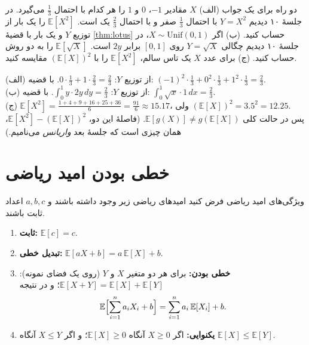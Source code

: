 \begin{example}[label=ex:lotus]{دو راه برای یک جواب}
  (الف) $X$ مقادیر $-1$، $0$ و $1$ را هر کدام با احتمال $\tfrac13$ می‌گیرد. در جلسهٔ ۱۰ دیدیم $Y=X^2$ با احتمال $\tfrac13$ صفر و با احتمال $\tfrac23$ یک است. $\mathbb E[X^2]$ را یک بار از توزیع $Y$ و یک بار با قضیهٔ \ref{thm:lotus} حساب کنید. (ب) اگر $X\sim\mathrm{Unif}(0,1)$، در جلسهٔ ۱۰ دیدیم چگالی $Y=\sqrt X$ روی $[0,1]$ برابر $2y$ است. $\mathbb E[\sqrt X]$ را به دو روش حساب کنید. (ج) برای عدد $X$ یک تاس سالم، $\mathbb E[X^2]$ را با $(\mathbb E[X])^2$ مقایسه کنید.
  \begin{solution}
    (الف) از توزیع $Y$: $0\cdot\tfrac13+1\cdot\tfrac23=\tfrac23$. با قضیه: $(-1)^2\cdot\tfrac13+0^2\cdot\tfrac13+1^2\cdot\tfrac13=\tfrac23$.\\
    (ب) از توزیع $Y$: $\int_0^1y\cdot2y\,dy=\tfrac23$. با قضیه: $\int_0^1\sqrt x\cdot1\,dx=\tfrac23$.\\
    (ج) $\mathbb E[X^2]=\frac{1+4+9+16+25+36}{6}=\frac{91}{6}\approx15.17$، ولی $(\mathbb E[X])^2=3.5^2=12.25$.\\
    پس در حالت کلی $\mathbb E[g(X)]\ne g(\mathbb E[X])$. (فاصلهٔ این دو، $\mathbb E[X^2]-(\mathbb E[X])^2$، همان چیزی است که جلسهٔ بعد \emph{واریانس} می‌نامیم.)
  \end{solution}
\end{example}

\section{خطی بودن امید ریاضی}
\label{sec:linearity}

\begin{theorem}[label=thm:expect-props]{ویژگی‌های امید ریاضی}
  فرض کنید امیدهای ریاضی زیر وجود داشته باشند و $a,b,c$ اعداد ثابت باشند.
  \begin{enumerate}
    \item \textbf{ثابت:} $\mathbb E[c]=c$.
    \item \textbf{تبدیل خطی:} $\mathbb E[aX+b]=a\,\mathbb E[X]+b$.
    \item \textbf{خطی بودن:} برای هر دو متغیر $X$ و $Y$ (روی یک فضای نمونه): $\mathbb E[X+Y]=\mathbb E[X]+\mathbb E[Y]$؛ و در نتیجه
          \[ \mathbb E\Bigl[\sum_{i=1}^na_iX_i+b\Bigr]=\sum_{i=1}^na_i\,\mathbb E[X_i]+b. \]
    \item \textbf{یکنوایی:} اگر $X\ge0$ آنگاه $\mathbb E[X]\ge0$؛ و اگر $X\le Y$ آنگاه $\mathbb E[X]\le\mathbb E[Y]$.
  \end{enumerate}
\end{theorem}

